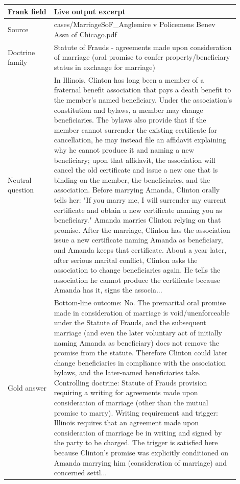 \begin{longtable}{p{0.18\linewidth}p{0.72\linewidth}}
\toprule
Frank field & Live output excerpt \\
\midrule
Source & cases/MarriageSoF\_Anglemire v Policemens Benev Assn of Chicago.pdf \\
Doctrine family & Statute of Frauds - agreements made upon consideration of marriage (oral promise to confer property/beneficiary status in exchange for marriage) \\
Neutral question & In Illinois, Clinton has long been a member of a fraternal benefit association that pays a death benefit to the member's named beneficiary. Under the association's constitution and bylaws, a member may change beneficiaries. The bylaws also provide that if the member cannot surrender the existing certificate for cancellation, he may instead file an affidavit explaining why he cannot produce it and naming a new beneficiary; upon that affidavit, the association will cancel the old certificate and issue a new one that is binding on the member, the beneficiaries, and the association. Before marrying Amanda, Clinton orally tells her: "If you marry me, I will surrender my current certificate and obtain a new certificate naming you as beneficiary." Amanda marries Clinton relying on that promise. After the marriage, Clinton has the association issue a new certificate naming Amanda as beneficiary, and Amanda keeps that certificate. About a year later, after serious marital conflict, Clinton asks the association to change beneficiaries again. He tells the association he cannot produce the certificate because Amanda has it, signs the associa... \\
Gold answer & Bottom-line outcome: No. The premarital oral promise made in consideration of marriage is void/unenforceable under the Statute of Frauds, and the subsequent marriage (and even the later voluntary act of initially naming Amanda as beneficiary) does not remove the promise from the statute. Therefore Clinton could later change beneficiaries in compliance with the association bylaws, and the later-named beneficiaries take. Controlling doctrine: Statute of Frauds provision requiring a writing for agreements made upon consideration of marriage (other than the mutual promise to marry). Writing requirement and trigger: Illinois requires that an agreement made upon consideration of marriage be in writing and signed by the party to be charged. The trigger is satisfied here because Clinton's promise was explicitly conditioned on Amanda marrying him (consideration of marriage) and concerned settl... \\

\end{longtable}
